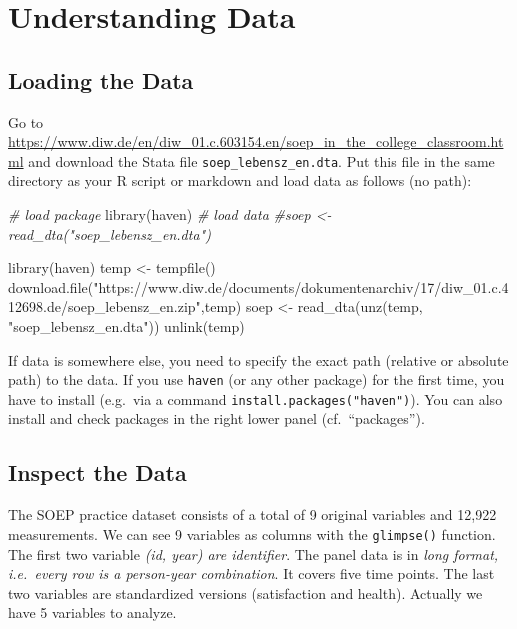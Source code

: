 \documentclass[
]{book}
\newenvironment{Shaded}{\begin{snugshade}}{\end{snugshade}}
\newcommand{\CommentTok}[1]{\textcolor[rgb]{0.56,0.35,0.01}{\textit{#1}}}
\newcommand{\FunctionTok}[1]{\textcolor[rgb]{0.00,0.00,0.00}{#1}}
\newcommand{\NormalTok}[1]{#1}
\newcommand{\OtherTok}[1]{\textcolor[rgb]{0.56,0.35,0.01}{#1}}
\newcommand{\StringTok}[1]{\textcolor[rgb]{0.31,0.60,0.02}{#1}}
\begin{document}
\hypertarget{understanding-data}{%
\section{Understanding Data}\label{understanding-data}}

\hypertarget{loading-the-data}{%
\subsection{Loading the Data}\label{loading-the-data}}

Go to \url{https://www.diw.de/en/diw_01.c.603154.en/soep_in_the_college_classroom.html} and download the Stata file \texttt{soep\_lebensz\_en.dta}. Put this file in the same directory as your R script or markdown and load data as follows (no path):

\begin{Shaded}
\begin{Highlighting}[]
\CommentTok{\# load package }
\FunctionTok{library}\NormalTok{(haven)}
\CommentTok{\# load data}
\CommentTok{\#soep \textless{}{-} read\_dta("soep\_lebensz\_en.dta")}

\FunctionTok{library}\NormalTok{(haven)}
\NormalTok{temp }\OtherTok{\textless{}{-}} \FunctionTok{tempfile}\NormalTok{()}
\FunctionTok{download.file}\NormalTok{(}\StringTok{"https://www.diw.de/documents/dokumentenarchiv/17/diw\_01.c.412698.de/soep\_lebensz\_en.zip"}\NormalTok{,temp)}
\NormalTok{soep }\OtherTok{\textless{}{-}} \FunctionTok{read\_dta}\NormalTok{(}\FunctionTok{unz}\NormalTok{(temp, }\StringTok{"soep\_lebensz\_en.dta"}\NormalTok{))}
\FunctionTok{unlink}\NormalTok{(temp)}
\end{Highlighting}
\end{Shaded}

If data is somewhere else, you need to specify the exact path (relative or absolute path) to the data. If you use \texttt{haven} (or any other package) for the first time, you have to install (e.g.~via a command \texttt{install.packages("haven")}). You can also install and check packages in the right lower panel (cf.~``packages'').

\hypertarget{inspect-the-data}{%
\subsection{Inspect the Data}\label{inspect-the-data}}

The SOEP practice dataset consists of a total of 9 original variables and 12,922 measurements. We can see 9 variables as columns with the \texttt{glimpse()} function. The first two variable \emph{(id, year) are identifier}. The panel data is in \emph{long format, i.e.~every row is a person-year combination}. It covers five time points. The last two variables are standardized versions (satisfaction and health). Actually we have 5 variables to analyze.
\end{document}

